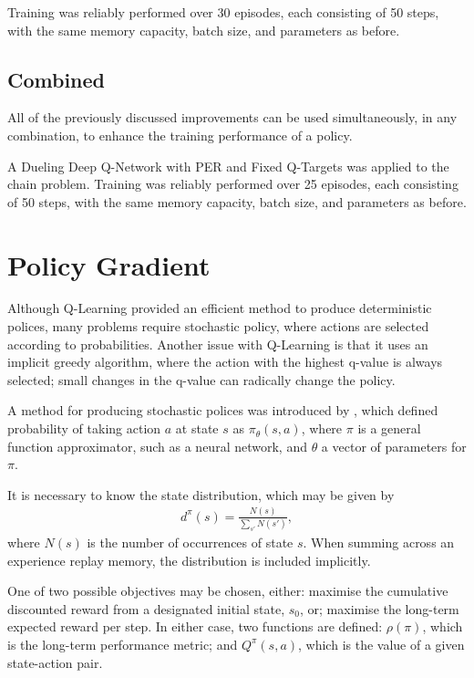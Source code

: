 Training was reliably performed over 30 episodes, each consisting of 50 steps,
with the same memory capacity, batch size, and parameters as before.



\subsection{Combined}

All of the previously discussed improvements can be used simultaneously, in any
combination, to enhance the training performance of a policy.

A Dueling Deep Q-Network with PER and Fixed Q-Targets was applied to the chain
problem.
Training was reliably performed over 25 episodes, each consisting of 50 steps,
with the same memory capacity, batch size, and parameters as before.



\section{Policy Gradient}

Although Q-Learning provided an efficient method to produce deterministic
polices, many problems require stochastic policy, where actions are selected
according to probabilities.
Another issue with Q-Learning is that it uses an implicit greedy algorithm,
where the action with the highest q-value is always selected; small changes in
the q-value can radically change the policy.

A method for producing stochastic polices was introduced by
\cite{Sutton:2000:Policy}, which defined probability of taking action $a$ at
state $s$ as $\pi_\theta(s,a)$, where $\pi$ is a general function approximator,
such as a neural network, and $\theta$ a vector of parameters for $\pi$.

It is necessary to know the state distribution, which may be given by
\begin{align*}
    d^\pi(s) = \frac{N(s)}{\sum_{s'} N(s')},
\end{align*}
where $N(s)$ is the number of occurrences of state $s$.
When summing across an experience replay memory, the distribution is included
implicitly.

One of two possible objectives may be chosen, either:
maximise the cumulative discounted reward from a designated initial state,
$s_0$, or;
maximise the long-term expected reward per step.
In either case, two functions are defined:
$\rho(\pi)$, which is the long-term performance metric;
and $Q^\pi(s,a)$, which is the value of a given state-action pair.


